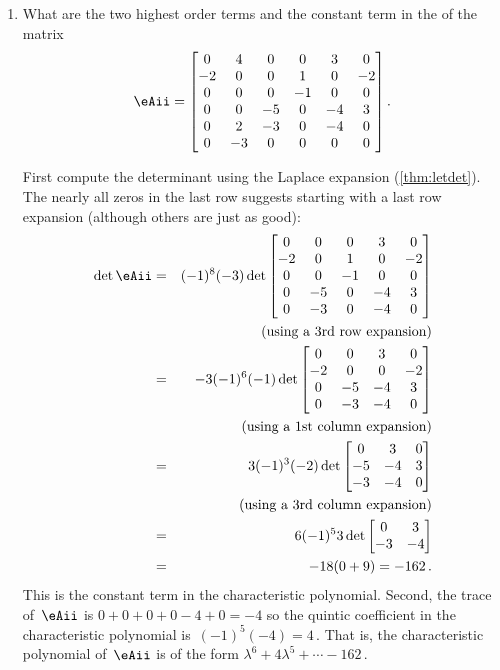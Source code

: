 \begin{example}
\begin{enumerate}
\item What are the two highest order terms and the constant term in the  of the matrix
\begin{equation*}
\eAii=\begin{bmatrix}0&4&0&0&3&0
\\-2&0&0&1&0&-2
\\0&0&0&-1&0&0
\\0&0&-5&0&-4&3
\\0&2&-3&0&-4&0
\\0&-3&0&0&0&0\end{bmatrix}.
\end{equation*}
\begin{solution} 
First compute the determinant using the Laplace expansion (\autoref{thm:letdet}).  
The nearly all zeros in the last row suggests starting with a last row expansion (although others are just as good):
\begin{eqnarray*}
\det \eAii&=&(-1)^8(-3)\det\begin{bmatrix}0&0&0&3&0
\\-2&0&1&0&-2
\\0&0&-1&0&0
\\0&-5&0&-4&3
\\0&-3&0&-4&0\end{bmatrix}
\\&&(\text{using a 3rd row expansion})
\\&=&-3(-1)^6(-1)\det\begin{bmatrix}0&0&3&0
\\-2&0&0&-2
\\0&-5&-4&3
\\0&-3&-4&0\end{bmatrix}
\\&&(\text{using a 1st column expansion})
\\&=&3(-1)^3(-2)\det\begin{bmatrix}0&3&0
\\-5&-4&3
\\-3&-4&0\end{bmatrix}
\\&&(\text{using a 3rd column expansion})
\\&=&6(-1)^53\det\begin{bmatrix}0&3
\\-3&-4\end{bmatrix}
\\&=&-18(0+9)=-162\,.
\end{eqnarray*}
This is the constant term in the characteristic polynomial.
Second, the trace of~\(\eAii\) is \(0+0+0+0-4+0=-4\) so the quintic coefficient in the characteristic polynomial is~\((-1)^5(-4)=4\)\,.
That is, the characteristic polynomial of~\(\eAii\) is of the form \(\lambda^6+4\lambda^5+\cdots-162\)\,.
\end{solution}

\end{enumerate}
\end{example}


